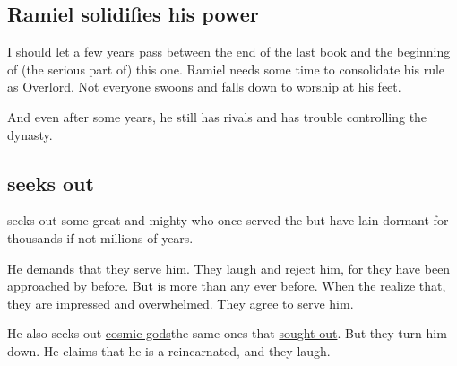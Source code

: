 \begin{garbage}
\subsection{Ramiel solidifies his power}
I should let a few years pass between the end of the last book and the beginning of (the serious part of) this one. 
Ramiel needs some time to consolidate his rule as Overlord. 
Not everyone swoons and falls down to worship at his feet. 

And even after some years, he still has rivals and has trouble controlling the dynasty. 









\subsection{\Vizsherioch{} seeks out \daemons}
\Vizsherioch{} seeks out some great and mighty \daemons{} who once served the \xzaishanns{} but have lain dormant for thousands if not millions of years. 

He demands that they serve him. They laugh and reject him, for they have been approached by \dragons{} before. But \Vizsherioch{} is more \xzaishann{} than any \dragon{} ever before. When the \daemons{} realize that, they are impressed and overwhelmed. They agree to serve him. 

He also seeks out \hyperref[Cosmic gods]{cosmic gods}\dash the same ones that \hyperref[Ishnaruchaefir seeks out cosmic gods]{\Ishnaruchaefir{} sought out}. But they turn him down. He claims that he is a \xzaishann{} reincarnated, and they laugh.









\end{garbage}
